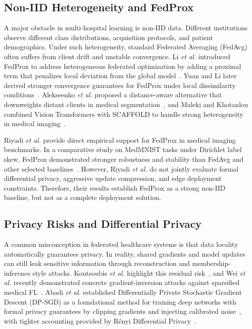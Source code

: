 \subsection{Non-IID Heterogeneity and FedProx}
A major obstacle in multi-hospital learning is non-IID data. Different
institutions observe different class distributions, acquisition protocols,
and patient demographics. Under such heterogeneity, standard Federated
Averaging (FedAvg) often suffers from client drift and unstable convergence.
Li \emph{et al.} introduced FedProx to address heterogeneous federated
optimization by adding a proximal term that penalizes local deviation from
the global model~\cite{li2020fedprox}. Yuan and Li later derived stronger
convergence guarantees for FedProx under local dissimilarity
conditions~\cite{yuan2022convergence}. Alekseenko \emph{et al.} proposed a
distance-aware alternative that downweights distant clients in medical
segmentation~\cite{alekseenko2024distance}, and Maleki and Khotanlou combined
Vision Transformers with SCAFFOLD to handle strong heterogeneity in medical
imaging~\cite{maleki2025handling}.

Riyadi \emph{et al.} provide direct empirical support for FedProx in medical
imaging benchmarks. In a comparative study on MedMNIST tasks under Dirichlet
label skew, FedProx demonstrated stronger robustness and stability than
FedAvg and other selected baselines~\cite{riyadi2026comparative}. However,
Riyadi \emph{et al.} do not jointly evaluate formal differential privacy,
aggressive update compression, and edge deployment constraints. Therefore,
their results establish FedProx as a strong non-IID baseline, but not as a
complete deployment solution.

\subsection{Privacy Risks and Differential Privacy}
A common misconception in federated healthcare systems is that data locality
automatically guarantees privacy. In reality, shared gradients and model
updates can still leak sensitive information through reconstruction and
membership-inference style attacks. Koutsoubis \emph{et al.} highlight this
residual risk~\cite{koutsoubis2024future}, and Wei \emph{et al.} recently
demonstrated concrete gradient-inversion attacks against sparsified medical
FL~\cite{wei2025medical}. Abadi \emph{et al.} established Differentially
Private Stochastic Gradient Descent (DP-SGD) as a foundational method for
training deep networks with formal privacy guarantees by clipping gradients
and injecting calibrated noise~\cite{abadi2016deep}, with tighter accounting
provided by R\'enyi Differential Privacy~\cite{mironov2017renyi}.

